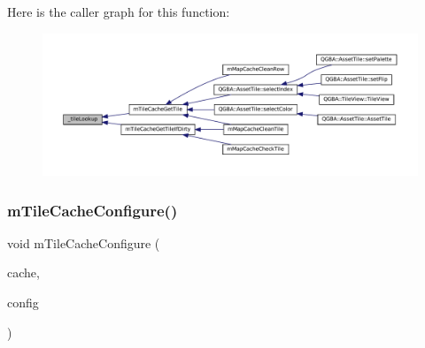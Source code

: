 Here is the caller graph for this function\+:
\nopagebreak
\begin{figure}[H]
\begin{center}
\leavevmode
\includegraphics[width=350pt]{tile-cache_8c_a643519288c92eb6c00a5f6694984f6d0_icgraph}
\end{center}
\end{figure}
\mbox{\label{tile-cache_8c_aac84a3d9543f7c4b29734b064d88bc53}} 
\subsubsection{\texorpdfstring{m\+Tile\+Cache\+Configure()}{mTileCacheConfigure()}}
{\footnotesize\ttfamily void m\+Tile\+Cache\+Configure (\begin{DoxyParamCaption}\item[{struct m\+Tile\+Cache $\ast$}]{cache,  }\item[{m\+Tile\+Cache\+Configuration}]{config }\end{DoxyParamCaption})}

